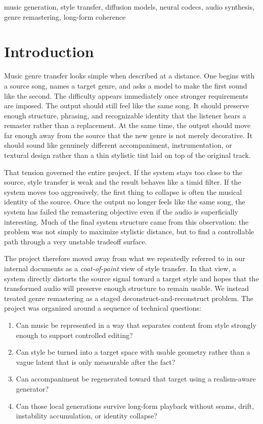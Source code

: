 \documentclass[conference]{IEEEtran}
\begin{document}
\begin{IEEEkeywords}
music generation, style transfer, diffusion models, neural codecs, audio synthesis, genre remastering, long-form coherence
\end{IEEEkeywords}

\section{Introduction}
Music genre transfer looks simple when described at a distance. One begins with a source song, names a target genre, and asks a model to make the first sound like the second. The difficulty appears immediately once stronger requirements are imposed. The output should still feel like the same song. It should preserve enough structure, phrasing, and recognizable identity that the listener hears a remaster rather than a replacement. At the same time, the output should move far enough away from the source that the new genre is not merely decorative. It should sound like genuinely different accompaniment, instrumentation, or textural design rather than a thin stylistic tint laid on top of the original track.

That tension governed the entire project. If the system stays too close to the source, style transfer is weak and the result behaves like a timid filter. If the system moves too aggressively, the first thing to collapse is often the musical identity of the source. Once the output no longer feels like the same song, the system has failed the remastering objective even if the audio is superficially interesting. Much of the final system structure came from this observation: the problem was not simply to maximize stylistic distance, but to find a controllable path through a very unstable tradeoff surface.

The project therefore moved away from what we repeatedly referred to in our internal documents as a \emph{coat-of-paint} view of style transfer. In that view, a system directly distorts the source signal toward a target style and hopes that the transformed audio will preserve enough structure to remain usable. We instead treated genre remastering as a staged deconstruct-and-reconstruct problem. The project was organized around a sequence of technical questions:
\begin{enumerate}[leftmargin=1.5em]
    \item Can music be represented in a way that separates content from style strongly enough to support controlled editing?
    \item Can style be turned into a target space with usable geometry rather than a vague latent that is only measurable after the fact?
    \item Can accompaniment be regenerated toward that target using a realism-aware generator?
    \item Can those local generations survive long-form playback without seams, drift, instability accumulation, or identity collapse?
\end{enumerate}
\end{document}

